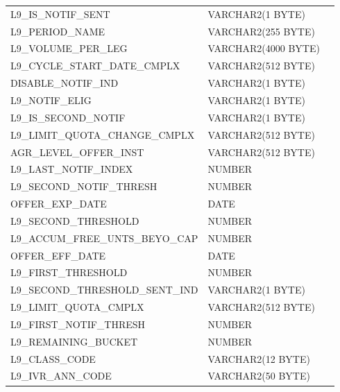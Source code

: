 \documentclass[12pt,twoside]{article}
\begin{document}
\begin{longtable}{lll}
 L9\_IS\_NOTIF\_SENT                  &  VARCHAR2(1 BYTE)     &               \\
 L9\_PERIOD\_NAME                     &  VARCHAR2(255 BYTE)   &               \\
 L9\_VOLUME\_PER\_LEG                 &  VARCHAR2(4000 BYTE)  &               \\
 L9\_CYCLE\_START\_DATE\_CMPLX        &  VARCHAR2(512 BYTE)   &               \\
 DISABLE\_NOTIF\_IND                  &  VARCHAR2(1 BYTE)     &               \\
 L9\_NOTIF\_ELIG                      &  VARCHAR2(1 BYTE)     &               \\
 L9\_IS\_SECOND\_NOTIF                &  VARCHAR2(1 BYTE)     &               \\
 L9\_LIMIT\_QUOTA\_CHANGE\_CMPLX      &  VARCHAR2(512 BYTE)   &               \\
 AGR\_LEVEL\_OFFER\_INST              &  VARCHAR2(512 BYTE)   &               \\
 L9\_LAST\_NOTIF\_INDEX               &  NUMBER               &               \\
 L9\_SECOND\_NOTIF\_THRESH            &  NUMBER               &               \\
 OFFER\_EXP\_DATE                     &  DATE                 &               \\
 L9\_SECOND\_THRESHOLD                &  NUMBER               &               \\
 L9\_ACCUM\_FREE\_UNTS\_BEYO\_CAP     &  NUMBER               &               \\
 OFFER\_EFF\_DATE                     &  DATE                 &               \\
 L9\_FIRST\_THRESHOLD                 &  NUMBER               &               \\
 L9\_SECOND\_THRESHOLD\_SENT\_IND     &  VARCHAR2(1 BYTE)     &               \\
 L9\_LIMIT\_QUOTA\_CMPLX              &  VARCHAR2(512 BYTE)   &               \\
 L9\_FIRST\_NOTIF\_THRESH             &  NUMBER               &               \\
 L9\_REMAINING\_BUCKET                &  NUMBER               &               \\
 L9\_CLASS\_CODE                      &  VARCHAR2(12 BYTE)    &               \\
 L9\_IVR\_ANN\_CODE                   &  VARCHAR2(50 BYTE)    &               \\

\end{longtable}
\end{document}
